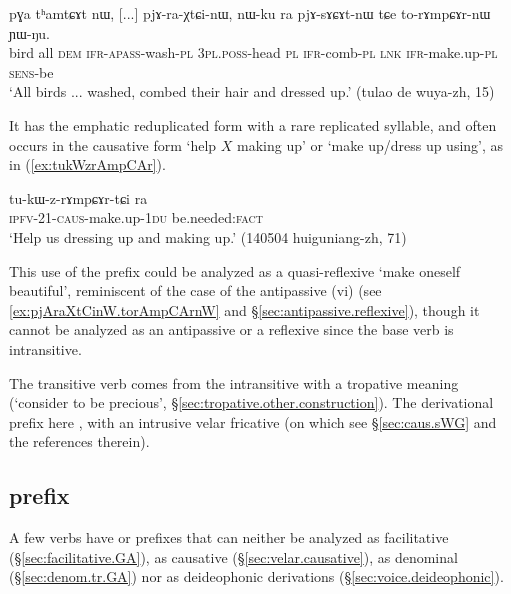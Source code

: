 \begin{exe}
\ex \label{ex:pjAraXtCinW.torAmpCArnW}
\gll pɣa tʰamtɕɤt nɯ, [...] pjɤ-ra-χtɕi-nɯ, nɯ-ku ra pjɤ-sɤɕɤt-nɯ tɕe to-rɤmpɕɤr-nɯ ɲɯ-ŋu. \\
bird all \textsc{dem} {  } \textsc{ifr}-\textsc{apass}-wash-\textsc{pl} \textsc{3pl}.\textsc{poss}-head \textsc{pl} \textsc{ifr}-comb-\textsc{pl} \textsc{lnk} \textsc{ifr}-make.up-\textsc{pl} \textsc{sens}-be \\
\glt `All birds ... washed, combed their hair and dressed up.' (tulao de wuya-zh, 15)
\end{exe}

It has the emphatic reduplicated form  with a rare  replicated syllable, and  often occurs in the causative form  `help $X$ making up' or `make up/dress up using', as in (\ref{ex:tukWzrAmpCAr}).

\begin{exe}
\ex \label{ex:tukWzrAmpCAr}
\gll tu-kɯ-z-rɤmpɕɤr-tɕi ra \\
\textsc{ipfv}-2\fl{}1-\textsc{caus}-make.up-\textsc{1du} be.needed:\textsc{fact} \\
\glt `Help us dressing up and making up.' (140504 huiguniang-zh, 71)
\end{exe}
 
This use of the  prefix could be analyzed as a quasi-reflexive `make oneself beautiful', reminiscent of the case of the antipassive  (vi) (see \ref{ex:pjAraXtCinW.torAmpCArnW} and §\ref{sec:antipassive.reflexive}), though it cannot be analyzed as an antipassive or a reflexive since the base verb is intransitive.

The transitive verb  comes from the intransitive  with a tropative meaning (`consider to be precious', §\ref{sec:tropative.other.construction}). The derivational prefix here , with an intrusive velar fricative (on which see §\ref{sec:caus.sWG} and the references therein).


\subsection{ prefix  }  \label{sec:GA.non.denom}
A few verbs have  or  prefixes that can neither be analyzed as  facilitative  (§\ref{sec:facilitative.GA}),  as causative (§\ref{sec:velar.causative}), as denominal  (§\ref{sec:denom.tr.GA}) nor as deideophonic derivations (§\ref{sec:voice.deideophonic}). 

